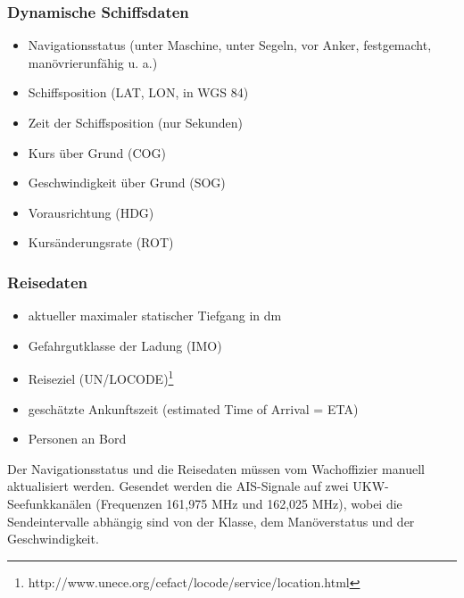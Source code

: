 \subsubsection{Dynamische Schiffsdaten} \label{Dynamische Schiffsdaten}
\begin{itemize}
\item Navigationsstatus (unter Maschine, unter Segeln, vor Anker, festgemacht, manövrierunfähig u. a.)
\item Schiffsposition (LAT, LON, in WGS 84)
\item Zeit der Schiffsposition (nur Sekunden)
\item Kurs über Grund (COG)
\item Geschwindigkeit über Grund (SOG)
\item Vorausrichtung (HDG)
\item Kursänderungsrate (ROT)
\end{itemize}

\subsubsection{Reisedaten} \label{Reisedaten}
\begin{itemize}
\item aktueller maximaler statischer Tiefgang in dm
\item Gefahrgutklasse der Ladung (IMO)
\item Reiseziel (UN/LOCODE)\footnote{http://www.unece.org/cefact/locode/service/location.html}
\item geschätzte Ankunftszeit (estimated Time of Arrival = ETA)
\item Personen an Bord
\end{itemize}

Der Navigationsstatus und die Reisedaten müssen vom Wachoffizier manuell aktualisiert werden. Gesendet werden die AIS-Signale auf zwei UKW-Seefunkkanälen (Frequenzen 161,975 MHz und 162,025 MHz), wobei die Sendeintervalle abhängig sind von der Klasse, dem Manöverstatus und der Geschwindigkeit.

